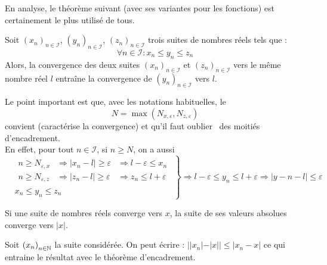 En analyse, le théorème suivant (avec ses variantes pour les fonctions) est certainement le plus utilisé de tous.
\begin{thmn}
Soit $\left(x_n \right)_{n\in\mathcal I}$, $\left(y_n \right)_{n\in\mathcal I}$, $\left(z_n \right)_{n\in\mathcal I}$ trois suites de nombres réels tels que :
\begin{displaymath}
 \forall n\in \mathcal I : x_n\leq y_n \leq z_n
\end{displaymath}
Alors, la convergence des deux suites $\left(x_n \right)_{n\in\mathcal I}$ et $\left(z_n \right)_{n\in\mathcal I}$ vers le même nombre réel $l$ entraîne la convergence de $\left(y_n \right)_{n\in\mathcal I}$ vers $l$.
\end{thmn}
\begin{demo}
 Le point important est que, avec les notations habituelles, le 
\begin{displaymath}
 N = \max(N_{x,\varepsilon },N_{z, \varepsilon})
\end{displaymath}
convient (caractérise la convergence) et qu'il faut \og oublier\fg~ des moitiés d'encadrement.\\
En effet, pour tout $n\in \mathcal I$, si $n\geq N$, on a aussi
\begin{displaymath}
\left. 
\begin{aligned}
&\begin{aligned}
 n\geq N_{\varepsilon , x} &\Rightarrow|x_n-l|\geq \varepsilon &\Rightarrow l-\varepsilon \leq x_n \\
 n\geq N_{\varepsilon , z} &\Rightarrow|z_n-l|\geq \varepsilon &\Rightarrow  z_n \leq l+\varepsilon
 \end{aligned}\\
&x_n \leq y_n \leq z_n
\end{aligned}
\right\rbrace 
\Rightarrow
l-\varepsilon \leq y_n \leq  l+\varepsilon
\Rightarrow |y-n -l|\leq\varepsilon
\end{displaymath}
\end{demo}
\begin{propn}\label{convabs}
 Si une suite de nombres réels converge vers $x$, la suite de ses valeurs absolues converge vers $|x|$.
\end{propn}
\begin{demo}
 Soit $\left( x_n\right) _{n\in \mathbb{N}}$ la suite considérée. On peut écrire : $||x_n|-|x||\leq |x_n-x|$ ce qui entraine le résultat avec le théorème d'encadrement.
\end{demo}

